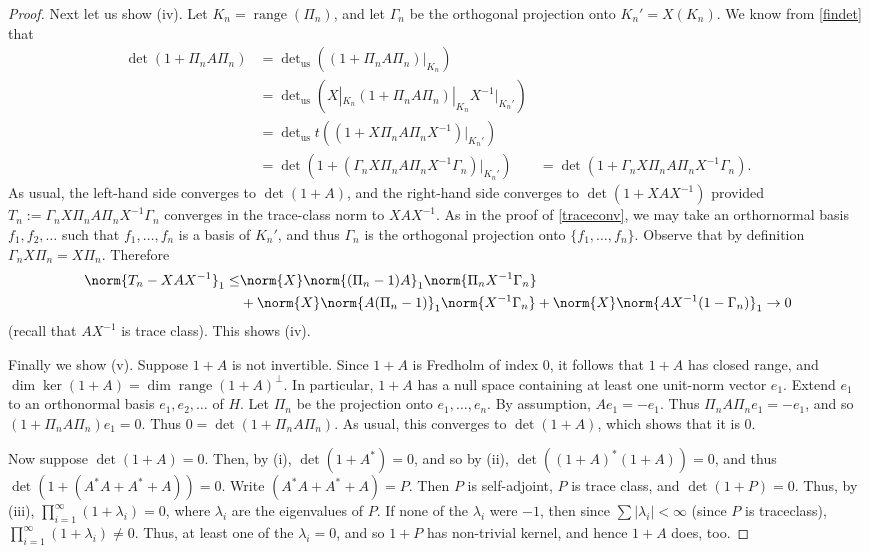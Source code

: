 \documentclass[12pt]{amsart}
\DeclareMathOperator{\range}{range}
\begin{document}
\begin{proof}
Next let us show (iv). Let $K_n = \range(\Pi_n)$, and let $\Gamma_n$ be the orthogonal projection onto $K_n' = X(K_n)$. We know from \cref{findet} that
\begin{align*}
\det(1+\Pi_n A \Pi_n) &= \det\nolimits_{\mathrm{us}}((1+\Pi_nA\Pi_n)|_{K_n})\\
 &= \det\nolimits_{\mathrm{us}}(X|_{K_n}(1+\Pi_nA\Pi_n)|_{K_n}X^{-1}|_{K_n'})\\
 & = \det\nolimits_{\mathrm{us}}t((1+X\Pi_n A\Pi_nX^{-1})|_{K_n'})\\
 &= \det(1+(\Gamma_nX\Pi_nA\Pi_nX^{-1}\Gamma_n)|_{K_n'})
 &= \det(1+\Gamma_nX\Pi_nA\Pi_nX^{-1}\Gamma_n).\end{align*}
As usual, the left-hand side converges to $\det(1+A)$, and the right-hand side converges to $\det(1+XAX^{-1})$ provided  $T_n := \Gamma_nX\Pi_nA\Pi_nX^{-1}\Gamma_n$ converges in the trace-class norm to $XAX^{-1}$. As in the proof of \cref{traceconv}, we may take an orthornormal basis $f_1,f_2,\ldots$ such that $f_1,\ldots,f_n$ is a basis of $K_n'$, and thus $\Gamma_n$ is the orthogonal projection onto $\{f_1,\ldots,f_n\}$. Observe that by definition $\Gamma_nX\Pi_n = X\Pi_n$. Therefore
\begin{align*}
\norm{T_n - XAX^{-1}}_1 \leq &\norm{X}\norm{(\Pi_n-1)A}_1\norm{\Pi_nX^{-1}\Gamma_n}\\
&+ \norm{X}\norm{A(\Pi_n-1)}_1\norm{X^{-1}\Gamma_n} + \norm{X}\norm{AX^{-1}(1-\Gamma_n)}_1 \to 0\end{align*}
(recall that $AX^{-1}$ is trace class). This shows (iv).

Finally we show (v). Suppose $1+A$ is not invertible. Since $1+A$ is Fredholm of index $0$, it follows that $1+A$ has closed range, and $\dim \ker (1+A) = \dim \range(1+A)^\bot$. In particular, $1+A$ has a null space containing at least one unit-norm vector $e_1$. Extend $e_1$ to an orthonormal basis $e_1,e_2,\ldots$ of $H$. Let $\Pi_n$ be the projection onto $e_1,\ldots,e_n$. By assumption, $Ae_1 = -e_1$. Thus $\Pi_n A\Pi_n e_1 = -e_1$, and so $(1+\Pi_n A \Pi_n)e_1 = 0$. Thus $0 = \det(1+\Pi_n A \Pi_n)$. As usual, this converges to $\det(1+A)$, which shows that it is $0$.

Now suppose $\det(1+A) = 0$. Then, by (i), $\det(1+A^\ast) = 0$, and so by (ii), $\det((1+A)^\ast(1+A)) = 0$, and thus $\det(1+ (A^\ast A + A^\ast + A)) = 0$. Write $(A^\ast A + A^\ast + A) = P$. Then $P$ is self-adjoint, $P$ is trace class, and $\det(1+P) = 0$. Thus, by (iii), $\prod_{i=1}^{\infty}(1+\lambda_i) = 0$, where $\lambda_i$ are the eigenvalues of $P$. If none of the $\lambda_i$ were $-1$, then since $\sum |\lambda_i| < \infty$ (since $P$ is traceclass), $\prod_{i=1}^{\infty} (1+\lambda_i) \neq 0$. Thus, at least one of the $\lambda_i = 0$, and so $1+P$ has non-trivial kernel, and hence $1+A$ does, too.


\end{proof}
\end{document}
